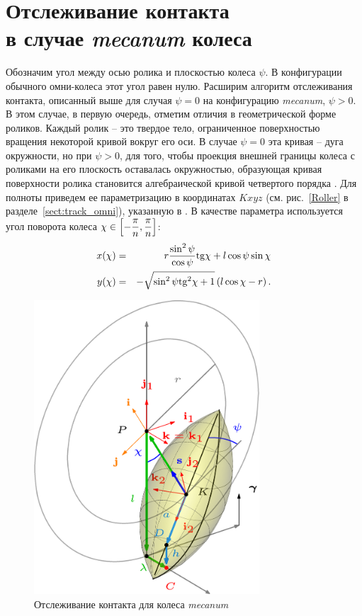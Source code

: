 \section[Отслеживание контакта в случае \textit{mecanum} колеса]{Отслеживание контакта \\ в случае \textit{mecanum} колеса}\label{sect:track_mecanum}

Обозначим угол между осью ролика и плоскостью колеса $\psi$. В конфигурации обычного омни-колеса этот угол равен нулю. Расширим алгоритм отслеживания контакта, описанный выше для случая $\psi = 0$ на конфигурацию \textit{mecanum}, $\psi > 0$. В этом случае, в первую очередь, отметим отличия в геометрической форме роликов. Каждый ролик -- это твердое тело, ограниченное поверхностью вращения некоторой кривой вокруг его оси. В случае $\psi = 0$ эта кривая -- дуга окружности, но при $\psi > 0$, для того, чтобы проекция внешней границы колеса с роликами на его плоскость оставалась окружностью, образующая кривая поверхности ролика становится алгебраической кривой четвертого порядка \cite{Gfrerrer2008}. Для полноты приведем ее параметризацию в координатах $Kxyz$ (см. рис.~\ref{Roller} в разделе~\ref{sect:track_omni}), указанную в \cite{Gfrerrer2008}. В качестве параметра используется угол поворота колеса $\chi \in \left[ -\displaystyle\frac{\displaystyle \pi}{\displaystyle n}, \displaystyle\frac{\displaystyle \pi}{\displaystyle n} \right]$:
\begin{eqnarray*}
    x(\chi) & = & r\displaystyle\frac{\displaystyle \sin^2\psi}{\displaystyle \cos\psi}\mathrm{tg}\chi + l\cos\psi\sin\chi \\
    y(\chi) & = & -\sqrt{\sin^2\psi\mathrm{tg}^2\chi + 1}\left(l\cos\chi - r\right).
\end{eqnarray*}

\begin{figure}[H]
    \centering
    \includegraphics[width=0.75\textwidth]{./content/pic/asy/pic_mecanum.png}
    \caption{Отслеживание контакта для колеса \textit{mecanum}}
    \label{fig:mecanum}
\end{figure}

